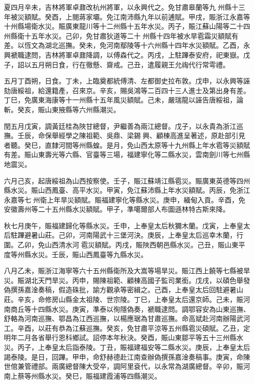 \begin{pinyinscope}
夏四月辛未，吉林將軍卓鼐改杭州將軍，以永興代之。免甘肅皋蘭等九州縣十三年被災額賦。癸酉，上閱蔣家壩。免江南沛縣九年以前逋賦。甲戌，賑浙江永嘉等十州縣場衛水災。賑廣東龍川等十二州縣十五年水災。丙子，賑江蘇山陽等二十四州縣衛十五年水災。己卯，免甘肅狄道等二十州縣十四年被水旱雹霜災額賦有差。以恆文為湖北巡撫。癸未，免河南鄢陵等十六州縣十四年水災額賦。乙酉，永興褫職逮問，吉林將軍卓鼐降調，以傅森代之。丙戌，上駐蹕泰安府，祀東嶽。戊子，詔以五月朔日食，行在徹懸、齋戒。己丑，遣履親王允祹代行常雩禮。

五月丁酉朔，日食。丁未，上臨奠都統傅清、左都御史拉布敦。戊申，以永興等誣劾唐綏祖，給還籍產，召來京。辛亥，賜吳鴻等二百四十三人進士及第出身有差。丁巳，免廣東海康等十一州縣十五年風災額賦。己未，嚴瑞龍以誣告唐綏祖，論斬。癸亥，賑山東掖縣等六州縣潮災。

閏五月戊寅，調黃廷桂為陜甘總督，尹繼善為兩江總督。戊子，以永貴為浙江巡撫。壬辰，命保舉經學之陳祖範、吳鼎、梁錫興、顧棟高進呈著述，原赴部引見者聽。癸巳，直隸河間等州縣蝗。是月，免山西太原等十九州縣上年水雹等災額賦有差。賑山東壽光等六縣、官臺等三場，福建寧化等二縣水災，雲南劍川等七州縣地震災。

六月己亥，起唐綏祖為山西按察使。壬子，賑江蘇靖江縣雹災。賑廣東英德等四州縣水災。賑山西鳳臺、高平水災。甲寅，免江蘇沛縣上年水災額賦。丙辰，免浙江永嘉等七州衛上年旱災額賦。賑福建寧化等縣水災。庚申，緬甸入貢。辛酉，免安徽壽州等二十五州縣水災額賦。甲子，準噶爾部人布圖遜林特古斯來降。

秋七月庚午，賑福建歸化等縣水災。壬申，上奉皇太后秋獮木蘭。戊寅，上奉皇太后駐蹕避暑山莊。己卯，河南陽武十三堡河決。庚辰，上奉皇太后巡幸木蘭，行圍。乙卯，免山西清水河雹災額賦。丙戌，賑陜西朝邑縣水災。己丑，賑山東平度等州縣水災。壬辰，賑山西鳳臺等九縣水災。

八月乙未，賑浙江海寧等六十五州縣衛所及大嵩等場旱災。賑江西上饒等七縣被旱災。賑湖北天門旱災。丙申，賜陳祖範、顧棟高國子監司業銜。戊戌，以碩色舉發偽撰孫嘉淦奏稿，假造硃批，諭方觀承等密緝之。己酉，上奉皇太后回駐避暑山莊。辛亥，命修房山縣金太祖陵、世宗陵。丁巳，上奉皇太后還京師。己未，賑河南商丘等十四縣水災。庚寅，準泰以徇隱偽奏，褫職逮問。調鄂容安為山東巡撫、舒輅為河南巡撫、鄂昌為江西巡撫，以楊應琚為甘肅巡撫。命高斌赴河南辦陽武河工。辛酉，以莊有恭為江蘇巡撫。癸亥，免甘肅平涼等五州縣雹災碩賦。乙丑，定明年二月各省舉行恩科鄉試。詔停本年秋決。癸酉，賑山東鄒平等五十三州縣水災。丙子，上奉皇太后詣泰陵。丁丑，賑福建福安等二縣水災。庚辰，上奉皇太后謁泰陵。是日，回蹕。甲申，命舒赫德赴江南查辦偽撰孫嘉淦奏稿事。庚寅，命陳世倌兼管禮部。兩廣總督陳大受卒，調阿里袞代，以永常為湖廣總督。辛卯，賑河南上蔡等州縣水災。癸巳，賑福建霞浦等四縣潮災。


\end{pinyinscope}
